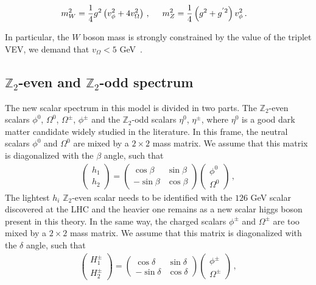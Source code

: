 \documentclass[12pt,letterpaper]{article}
\begin{document}
\begin{align}
\label{eq:mW-mZ}
m_W^2 &= \dfrac{1}{4}g^2\left(v_{\phi}^2+4v_{\Omega}^2\right)\,,\hspace{0.5 cm} 
m_Z^2=\dfrac{1}{4}\left(g^2+g^{'2}\right)v_{\phi}^2\,.
\end{align}

In particular, the $W$ boson mass is strongly constrained by the value of the triplet VEV, we demand that $v_{\Omega}< 5$ GeV~\cite{Agashe:2014kda}.

\subsection{$\mathbb{Z}_2$-even and $\mathbb{Z}_2$-odd spectrum}
The new scalar spectrum in this model is divided in two parts. The $\mathbb{Z}_2$-even scalars $\phi^0$, $\Omega^0$, $\Omega^{\pm}$, $\phi^{\pm}$ and the $\mathbb{Z}_2$-odd scalars $\eta^0$, $\eta^{\pm}$, where $\eta^0$ is a good dark matter candidate widely studied in the literature.
%
In this frame, the neutral scalars $\phi^0$ and $\Omega^0$ are mixed by a $2\times 2$ mass matrix. We assume that this matrix is diagonalized with the $\beta$ angle, such that
%
\begin{align}
\label{eq:beta-mixing}
\begin{pmatrix}
h_1 \\ h_2 
\end{pmatrix}=
\begin{pmatrix}
\cos\beta & \sin\beta \\
-\sin\beta & \cos\beta
\end{pmatrix}
\begin{pmatrix}
\phi^0 \\ \Omega^0 
\end{pmatrix}\,,
\end{align} 
%
The lightest $h_i$ $\mathbb{Z}_2$-even scalar needs to be identified with the $126$ GeV scalar discovered at the LHC and the heavier one remains as a new scalar higgs boson present in this theory.  
%
In the same way, the charged scalars $\phi^{\pm}$ and $\Omega^{\pm}$ are too mixed by a $2\times 2$ mass matrix. We assume that this matrix is diagonalized with the $\delta$ angle, such that
%
\begin{align}
\label{eq:delta-mixing}
\begin{pmatrix}
H_1^{\pm} \\ H_2^{\pm} 
\end{pmatrix}=
\begin{pmatrix}
\cos\delta & \sin\delta \\
-\sin\delta & \cos\delta
\end{pmatrix}
\begin{pmatrix}
\phi^{\pm} \\ \Omega^{\pm} 
\end{pmatrix}\,,
\end{align} 
\end{document}
